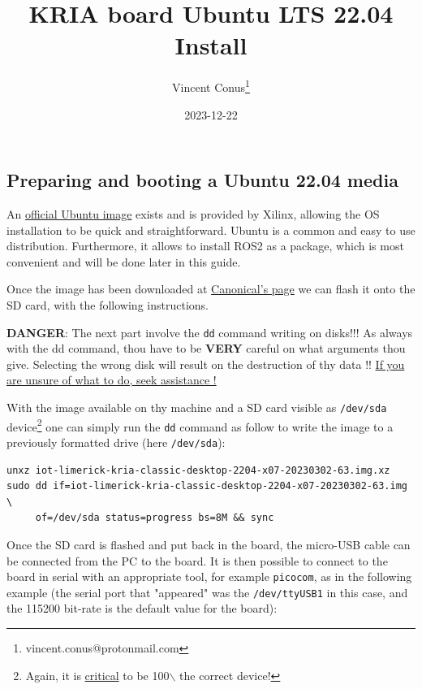 \documentclass[10pt]{article}
\author{Vincent Conus\thanks{vincent.conus@protonmail.com}}
\date{2023-12-22}
\title{KRIA board Ubuntu LTS 22.04 Install}
\begin{document}
\maketitle
\tableofcontents

\subsection{Preparing and booting a Ubuntu 22.04 media}
\label{sec:org6fcb429}
An \href{https://ubuntu.com/download/amd-xilinx}{official Ubuntu image} exists and is
provided by Xilinx, allowing the OS installation to be quick and
straightforward.
Ubuntu is a common and easy to use distribution. Furthermore,
it allows to install ROS2 as a package, which is most convenient and will be
done later in this guide.

Once the image has been downloaded at \href{https://ubuntu.com/download/amd-xilinx}{Canonical's page}
we can flash it onto the SD card, with the following instructions.

\begin{tcolorbox}[colback=red!5!white,colframe=red!75!black]
\textbf{DANGER}: The next part involve the \texttt{dd} command writing on disks!!!
As always with the dd command, thou have to be \textbf{VERY} careful on what arguments
thou give. Selecting the wrong disk will result on the destruction of
thy data !!
\uline{If you are unsure of what to do, seek assistance !}
\end{tcolorbox}

With the image available on thy machine and a SD card visible as \texttt{/dev/sda} device\footnote{Again, it is \uline{critical} to be 100$\backslash$%
the correct device!}
one can simply run the \texttt{dd} command as follow to write the image to a previously formatted drive (here \texttt{/dev/sda}):

\begin{verbatim}
unxz iot-limerick-kria-classic-desktop-2204-x07-20230302-63.img.xz
sudo dd if=iot-limerick-kria-classic-desktop-2204-x07-20230302-63.img \
     of=/dev/sda status=progress bs=8M && sync
\end{verbatim}


Once the SD card is flashed and put back in the board, the micro-USB cable can be
connected from the PC to the board. It is then possible to
connect to the board in serial with an appropriate tool, for example \texttt{picocom},
as in the following example (the serial port that "appeared" was the \texttt{/dev/ttyUSB1} in this case,
and the 115200 bit-rate is the default value for the board):
\end{document}
